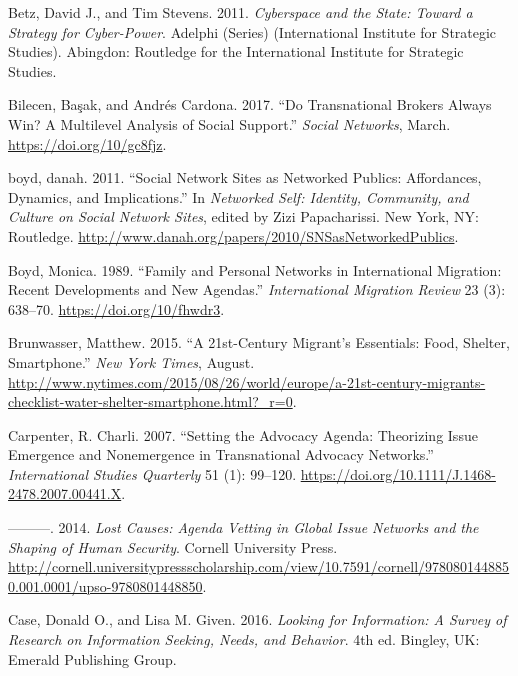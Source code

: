 \documentclass[
]{article}
\newlength{\cslhangindent}
\newenvironment{cslreferences}%
  {\setlength{\parindent}{0pt}%
  \everypar{\setlength{\hangindent}{\cslhangindent}}\ignorespaces}%
  {\par}
\begin{document}
\begin{cslreferences}
\leavevmode\hypertarget{ref-Betz2011Cyberspace}{}%
Betz, David J., and Tim Stevens. 2011. \emph{Cyberspace and the State:
Toward a Strategy for Cyber-Power}. Adelphi (Series) (International
Institute for Strategic Studies). Abingdon: Routledge for the
International Institute for Strategic Studies.

\leavevmode\hypertarget{ref-Bilecen2017Do}{}%
Bilecen, Başak, and Andrés Cardona. 2017. ``Do Transnational Brokers
Always Win? A Multilevel Analysis of Social Support.'' \emph{Social
Networks}, March. \url{https://doi.org/10/gc8fjz}.

\leavevmode\hypertarget{ref-boyd2011Social}{}%
boyd, danah. 2011. ``Social Network Sites as Networked Publics:
Affordances, Dynamics, and Implications.'' In \emph{Networked Self:
Identity, Community, and Culture on Social Network Sites}, edited by
Zizi Papacharissi. New York, NY: Routledge.
\url{http://www.danah.org/papers/2010/SNSasNetworkedPublics}.

\leavevmode\hypertarget{ref-Boyd1989Family}{}%
Boyd, Monica. 1989. ``Family and Personal Networks in International
Migration: Recent Developments and New Agendas.'' \emph{International
Migration Review} 23 (3): 638--70. \url{https://doi.org/10/fhwdr3}.

\leavevmode\hypertarget{ref-Brunwasser201521st-Century}{}%
Brunwasser, Matthew. 2015. ``A 21st-Century Migrant's Essentials: Food,
Shelter, Smartphone.'' \emph{New York Times}, August.
\url{http://www.nytimes.com/2015/08/26/world/europe/a-21st-century-migrants-checklist-water-shelter-smartphone.html?_r=0}.

\leavevmode\hypertarget{ref-Carpenter2007Setting}{}%
Carpenter, R. Charli. 2007. ``Setting the Advocacy Agenda: Theorizing
Issue Emergence and Nonemergence in Transnational Advocacy Networks.''
\emph{International Studies Quarterly} 51 (1): 99--120.
\url{https://doi.org/10.1111/J.1468-2478.2007.00441.X}.

\leavevmode\hypertarget{ref-Carpenter2014Lost}{}%
---------. 2014. \emph{Lost Causes: Agenda Vetting in Global Issue
Networks and the Shaping of Human Security}. Cornell University Press.
\url{http://cornell.universitypressscholarship.com/view/10.7591/cornell/9780801448850.001.0001/upso-9780801448850}.

\leavevmode\hypertarget{ref-Case2016Looking}{}%
Case, Donald O., and Lisa M. Given. 2016. \emph{Looking for Information:
A Survey of Research on Information Seeking, Needs, and Behavior}. 4th
ed. Bingley, UK: Emerald Publishing Group.


\end{cslreferences}
\end{document}
